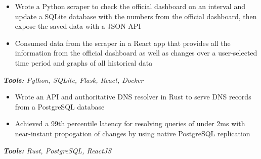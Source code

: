 \documentclass[10pt,letter]{altacv}
\begin{document}
\begin{itemize}
\item Wrote a Python scraper to check the official dashboard on an interval and update a SQLite database with the numbers from the official dashboard, then expose the saved data with a JSON API
\item Consumed data from the scraper in a React app that provides all the information from the official dashboard as well as changes over a user-selected time period and graphs of all historical data
\end{itemize}
\textit{\textbf{Tools:} Python, SQLite, Flask, React, Docker}


\begin{itemize}
  \item Wrote an API and authoritative DNS resolver in Rust to serve DNS records \\ from a PostgreSQL database
  \item Achieved a 99th percentile latency for resolving queries of under 2ms with \\ near-instant propogation of changes by using native PostgreSQL replication
\end{itemize}
\textit{\textbf{Tools:} Rust, PostgreSQL, ReactJS}


\end{document}
